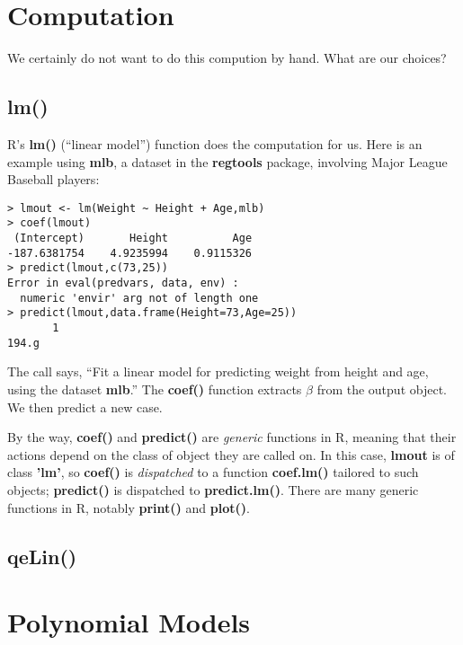 \section{Computation}

We certainly do not want to do this compution by hand.  What are our
choices?

\subsection{lm()}

R's \textbf{lm()} (``linear model'') function does the computation for
us.  Here is an example using \textbf{mlb}, a dataset in the
\textbf{regtools} package, involving Major League Baseball players:

\begin{lstlisting}
> lmout <- lm(Weight ~ Height + Age,mlb)
> coef(lmout)
 (Intercept)       Height          Age 
-187.6381754    4.9235994    0.9115326 
> predict(lmout,c(73,25))
Error in eval(predvars, data, env) : 
  numeric 'envir' arg not of length one
> predict(lmout,data.frame(Height=73,Age=25))
       1 
194.g
\end{lstlisting}

The call says, ``Fit a linear model for predicting weight from height
and age, using the dataset \textbf{mlb}.''  The \textbf{coef()} function
extracts $\widehat{\beta}$ from the output object.  We then predict a
new case.

By the way, \textbf{coef()} and \textbf{predict()} are \textit{generic}
functions in R, meaning that their actions depend on the class of object
they are called on.  In this case, \textbf{lmout} is of class
\textbf{'lm'}, so \textbf{coef()} is \textit{dispatched} to a function
\textbf{coef.lm()} tailored to such objects; \textbf{predict()} is
dispatched to \textbf{predict.lm()}.  There are many generic functions
in R, notably \textbf{print()} and \textbf{plot()}.

\subsection{qeLin()}

\section{Polynomial Models}

